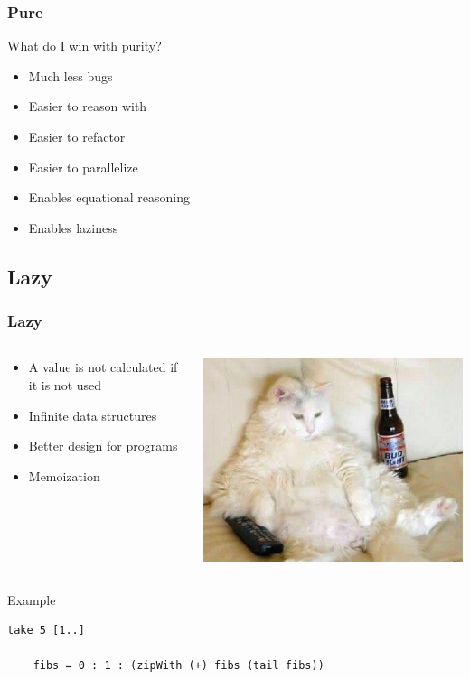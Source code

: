 \documentclass{beamer}
\begin{document}
\begin{frame}
\frametitle{Pure}

What do I win with purity?
 \vspace{0.5cm}
 \begin{itemize}
  \item Much less bugs
  \item Easier to reason with
  \item Easier to refactor
  \item Easier to parallelize
  \item Enables equational reasoning
  \item Enables laziness
 \end{itemize}
 
\end{frame}


\subsection{Lazy}
\begin{frame}[fragile]
\frametitle{Lazy}

 \begin{columns}[]
  \begin{column}[]{5cm}
   \begin{itemize}
  \item A value is not calculated if it is not used
  \item Infinite data structures
  \item Better design for programs
  \item Memoization
 \end{itemize}
  \end{column}
  \begin{column}[]{5cm}
    \includegraphics[width=0.8\linewidth]{figs/lazy_cat}
  \end{column}
 \end{columns}

 \vspace{0.5cm}
 \begin{block}{Example}
  \begin{lstlisting}[basicstyle=\small]
    take 5 [1..]

    fibs = 0 : 1 : (zipWith (+) fibs (tail fibs))
  \end{lstlisting}
 \end{block}
 
\end{frame}
\end{document}
